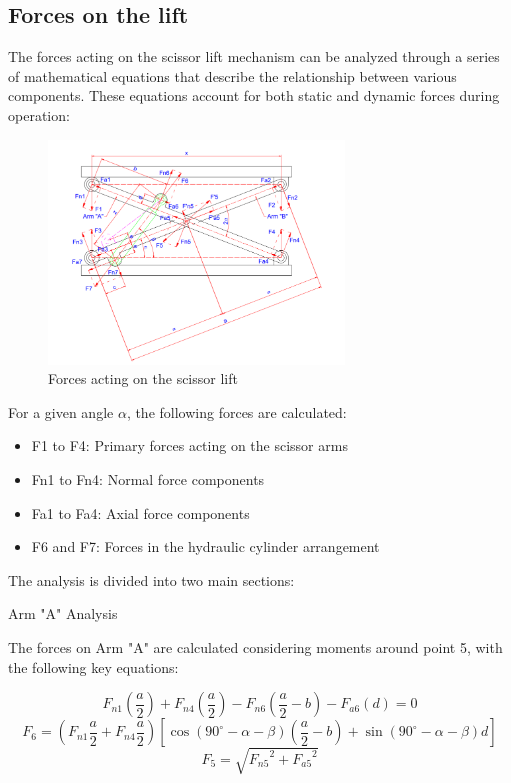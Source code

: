 \documentclass[../../main]{subfiles}
\begin{document}
\subsection{Forces on the lift}

The forces acting on the scissor lift mechanism can be analyzed through
a series of mathematical equations that describe the relationship
between various components. These equations account for both static and
dynamic forces during operation:

\begin{figure}[ht]
\centering
\includegraphics[width=0.7\textwidth]{img/image017.png}
\caption{Forces acting on the scissor lift}
\end{figure}

For a given angle $\alpha$, the following forces are calculated:

\begin{itemize}
\item
  F1 to F4: Primary forces acting on the scissor arms
\item
  Fn1 to Fn4: Normal force components
\item
  Fa1 to Fa4: Axial force components
\item
  F6 and F7: Forces in the hydraulic cylinder arrangement
\end{itemize}

The analysis is divided into two main sections:

Arm "A" Analysis

The forces on Arm "A" are calculated considering moments around point 5,
with the following key equations:

\begin{equation}
  F_{n1}\left(\frac{a}{2}\right) + F_{n4}\left(\frac{a}{2}\right) - F_{n6}\left(\frac{a}{2} - b\right) - F_{a6}(d) = 0
  \end{equation}
  \begin{equation}
    F_6 = \left(F_{n1} \frac{a}{2} + F_{n4} \frac{a}{2}\right) \left[\cos(90^\circ - \alpha - \beta)\left(\frac{a}{2} - b\right) + \sin(90^\circ - \alpha - \beta)d\right]
    \end{equation}
    \begin{equation}
      F_5 = \sqrt{{F_{n5}}^2 + {F_{a5}}^2}
  \end{equation}
\end{document}
